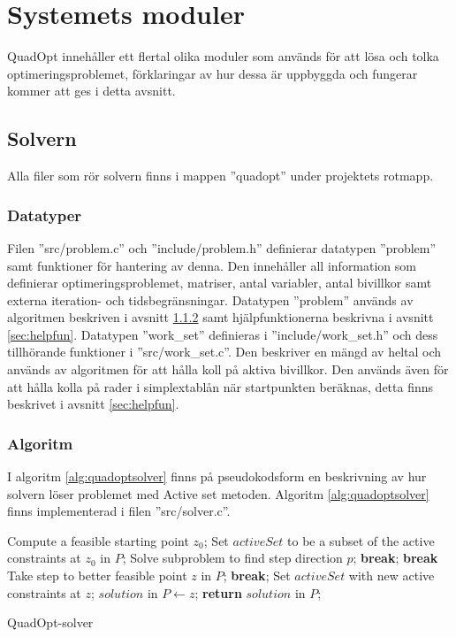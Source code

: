 \section{Systemets moduler}
QuadOpt innehåller ett flertal olika moduler som används för att lösa och tolka optimeringsproblemet, förklaringar av hur dessa är uppbyggda och fungerar kommer att ges i detta avsnitt.

\subsection{Solvern}
Alla filer som rör solvern finns i mappen ''quadopt'' under projektets rotmapp.

\subsubsection{Datatyper}
Filen ''src/problem.c'' och ''include/problem.h'' definierar datatypen ''problem'' samt funktioner för hantering av denna. Den innehåller all information som definierar optimeringsproblemet, matriser, antal variabler, antal bivillkor samt externa iteration- och tidsbegränsningar. Datatypen ''problem'' används av algoritmen beskriven i avsnitt \ref{sec:algoritm} samt hjälpfunktionerna beskrivna i avsnitt \ref{sec:helpfun}.
\newline
\newline
Datatypen ''work\_set'' definieras i ''include/work\_set.h'' och dess tillhörande funktioner i ''src/work\_set.c''. Den beskriver en mängd av heltal och används av algoritmen för att hålla koll på aktiva bivillkor. Den används även för att hålla kolla på rader i simplextablån när startpunkten beräknas, detta finns beskrivet i avsnitt \ref{sec:helpfun}.

\subsubsection{Algoritm} \label{sec:algoritm}
 I algoritm \ref{alg:quadoptsolver} finns på pseudokodsform en beskrivning av hur solvern löser problemet med Active set metoden. Algoritm \ref{alg:quadoptsolver} finns implementerad i filen ''src/solver.c''.

\begin{algorithm}[H]
\begin{algorithmic}
	\State Compute a feasible starting point $z_0$;
\EndIf	
\State Set $activeSet$ to be a subset of the active constraints at $z_0$ in $P$;
	\State Solve subproblem to find step direction $p$;
			\State \textbf{break};
		\EndIf		
			\State \textbf{break}
		\EndIf
	\Else
		\State Take step to better feasible point $z$ in $P$;
			\State \textbf{break};
		\EndIf
		\State Set $activeSet$ with new active constraints at $z$;	
	\EndIf
\EndWhile
\State  $solution$ in $P\gets z$;
\State \textbf{return} $solution$ in $P$;
\EndProcedure
\end{algorithmic}
\caption{QuadOpt-solver}
\label{alg:quadoptsolver}
\end{algorithm}

